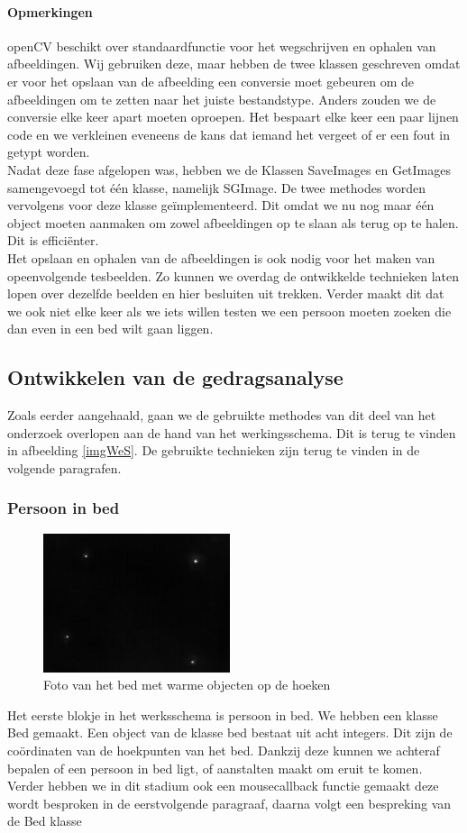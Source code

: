 \paragraph{Opmerkingen}
openCV beschikt over standaardfunctie voor het wegschrijven en ophalen van afbeeldingen. Wij gebruiken deze, maar hebben de twee klassen geschreven omdat er voor het opslaan van de afbeelding een conversie moet gebeuren om de afbeeldingen om te zetten naar het juiste bestandstype. Anders zouden we de conversie elke keer apart moeten oproepen. Het bespaart elke keer een paar lijnen code en we verkleinen eveneens de kans dat iemand het vergeet of er een fout in getypt worden.\\
Nadat deze fase afgelopen was, hebben we de Klassen SaveImages en GetImages samengevoegd tot \'e\'en klasse, namelijk SGImage. De twee methodes worden vervolgens voor deze klasse ge\"implementeerd. Dit omdat we nu nog maar \'e\'en object moeten aanmaken om zowel afbeeldingen op te slaan als terug op te halen. Dit is effici\"enter. \\
Het opslaan en ophalen van de afbeeldingen is ook nodig voor het maken van opeenvolgende tesbeelden. Zo kunnen we overdag de ontwikkelde technieken laten lopen over dezelfde beelden en hier besluiten uit trekken. Verder maakt dit dat we ook niet elke keer als we iets willen testen we een persoon moeten zoeken die dan even in een bed wilt gaan liggen.

\subsection{Ontwikkelen van de gedragsanalyse}
Zoals eerder aangehaald, gaan we de gebruikte methodes van dit deel van het onderzoek overlopen aan de hand van het werkingsschema. Dit is terug te vinden in afbeelding \ref{imgWeS}. De gebruikte technieken zijn terug te vinden in de volgende paragrafen.

\subsubsection{Persoon in bed}
\begin{figure}[hbp]
	\includegraphics[scale=0.75]{SeekCamBed}
	\caption{Foto van het bed met warme objecten op de hoeken}
	\label{imgCBe}
\end{figure}
Het eerste blokje in het werksschema is persoon in bed. We hebben een klasse Bed gemaakt. Een object van de klasse bed bestaat uit acht integers. Dit zijn de co\"ordinaten van de hoekpunten van het bed. Dankzij deze kunnen we achteraf bepalen of een persoon in bed ligt, of aanstalten maakt om eruit te komen. Verder hebben we in dit stadium ook een mousecallback functie gemaakt deze wordt besproken in de eerstvolgende paragraaf, daarna volgt een bespreking van de Bed klasse \\

